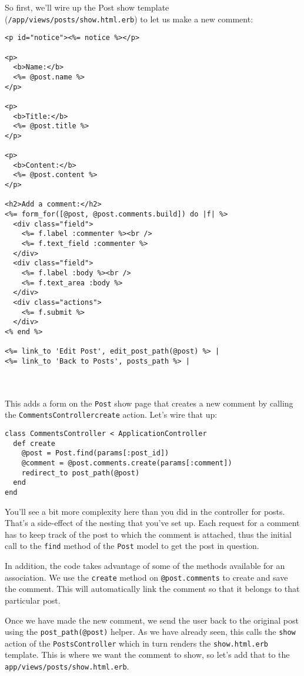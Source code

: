 \documentclass[10pt]{book}
\begin{document}
So first, we’ll wire up the Post show template (\texttt{/app/views/posts/show.html.erb}) to let us make a new comment:

\begin{minipage}{\textwidth}
\begin{verbatim}
<p id="notice"><%= notice %></p>
 
<p>
  <b>Name:</b>
  <%= @post.name %>
</p>
 
<p>
  <b>Title:</b>
  <%= @post.title %>
</p>
 
<p>
  <b>Content:</b>
  <%= @post.content %>
</p>
 
<h2>Add a comment:</h2>
<%= form_for([@post, @post.comments.build]) do |f| %>
  <div class="field">
    <%= f.label :commenter %><br />
    <%= f.text_field :commenter %>
  </div>
  <div class="field">
    <%= f.label :body %><br />
    <%= f.text_area :body %>
  </div>
  <div class="actions">
    <%= f.submit %>
  </div>
<% end %>
 
<%= link_to 'Edit Post', edit_post_path(@post) %> |
<%= link_to 'Back to Posts', posts_path %> |
\end{verbatim}
\end{minipage}
\\ \\

This adds a form on the \texttt{Post} show page that creates a new comment by calling the \texttt{CommentsController}\texttt{create} action. Let’s wire that up:


\begin{verbatim}
class CommentsController < ApplicationController
  def create
    @post = Post.find(params[:post_id])
    @comment = @post.comments.create(params[:comment])
    redirect_to post_path(@post)
  end
end
\end{verbatim}

You’ll see a bit more complexity here than you did in the controller for posts. That’s a side-effect of the nesting that you’ve set up. Each request for a comment has to keep track of the post to which the comment is attached, thus the initial call to the \texttt{find} method of the \texttt{Post} model to get the post in question.

In addition, the code takes advantage of some of the methods available for an association. We use the \texttt{create} method on \texttt{@post.comments} to create and save the comment. This will automatically link the comment so that it belongs to that particular post.

Once we have made the new comment, we send the user back to the original post using the \texttt{post\_path(@post)} helper. As we have already seen, this calls the \texttt{show} action of the \texttt{PostsController} which in turn renders the \texttt{show.html.erb} template. This is where we want the comment to show, so let’s add that to the \texttt{app/views/posts/show.html.erb}.
\end{document}
